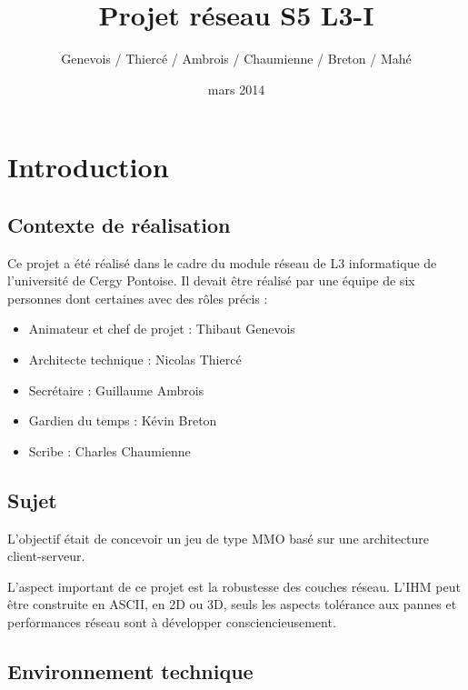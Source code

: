 \documentclass[11pt, a4paper]{report}
\title{Projet réseau S5 L3-I}
\author{Genevois / Thiercé / Ambrois / Chaumienne / Breton / Mahé}
\date{mars 2014}
\begin{document}
\maketitle
\renewcommand{\contentsname}{Sommaire}
\tableofcontents

\chapter{Introduction}

  \section{Contexte de réalisation}
    
    Ce projet a été réalisé dans le cadre du module réseau de L3 informatique de l'université de Cergy Pontoise. Il devait être réalisé 
    par une équipe de six personnes dont certaines avec des rôles précis :
    \newline
    
    \begin{itemize}
    
     \item Animateur et chef de projet : Thibaut Genevois
     \item Architecte technique : Nicolas Thiercé
     \item Secrétaire : Guillaume Ambrois
     \item Gardien du temps : Kévin Breton
     \item Scribe : Charles Chaumienne
     
    \end{itemize}
    
  \section{Sujet}
    
    L'objectif était de concevoir un jeu de type MMO basé sur une architecture client-serveur.
    \newline
    
    L'aspect important de ce projet est la robustesse des couches réseau. L'IHM peut être construite en ASCII, en 2D ou 3D, seuls les aspects tolérance
    aux pannes et performances réseau sont à développer consciencieusement.
    
  \section{Environnement technique}
    
\end{document}
